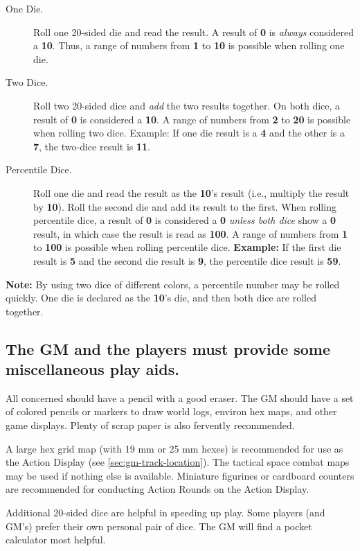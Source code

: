 \begin{description}
\item[One Die.] Roll one 20-sided die and read the result.  A result of
  \textbf{0} is \emph{always} considered a \textbf{10}.  Thus, a range
  of numbers from \textbf{1} to \textbf{10} is possible when rolling
  one die.
\item[Two Dice.] Roll two 20-sided dice and \emph{add} the two results
  together.  On both dice, a result of \textbf{0} is considered a
  \textbf{10}.  A range of numbers from \textbf{2} to \textbf{20} is
  possible when rolling two dice.  Example: If one die result is a
  \textbf{4} and the other is a \textbf{7}, the two-dice result is
  \textbf{11}.
\item[Percentile Dice.] Roll one die and read the result as the
  \textbf{10}'s result (i.e., multiply the result by \textbf{10}).
  Roll the second die and add its result to the first.  When rolling
  percentile dice, a result of \textbf{0} is considered a \textbf{0}
  \emph{unless both dice} show a \textbf{0} result, in which case the
  result is read as \textbf{100}.  A range of numbers from \textbf{1}
  to \textbf{100} is possible when rolling percentile dice.
  \textbf{Example:} If the first die result is \textbf{5} and the
  second die result is \textbf{9}, the percentile dice result is
  \textbf{59}.
\end{description}

\textbf{Note:} By using two dice of different colors, a percentile
number may be rolled quickly.  One die is declared as the \textbf{10}'s
die, and then both dice are rolled together.


\subsection[Play Aids]{The GM and the players must provide some
  miscellaneous play aids.}
\label{sec:gm-players-must}

All concerned should have a pencil with a good eraser.  The GM should
have a set of colored pencils or markers to draw world logs, environ
hex maps, and other game displays.  Plenty of scrap paper is also
fervently recommended.

A large hex grid map (with 19 mm or 25 mm hexes) is recommended for
use as the Action Display (see \ref{sec:gm-track-location}).  The
tactical space combat maps may be used if nothing else is available.
Miniature figurines or cardboard counters are recommended for
conducting Action Rounds on the Action Display.

Additional 20-sided dice are helpful in speeding up play.  Some
players (and GM's) prefer their own personal pair of dice.  The GM
will find a pocket calculator most helpful.




